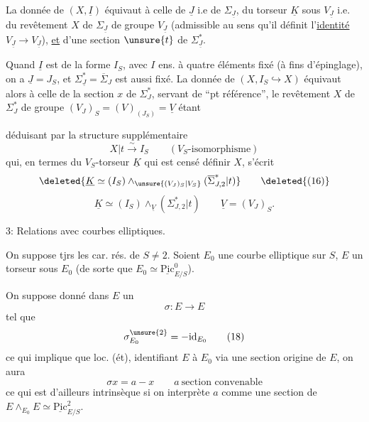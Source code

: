  La donnée de $(X,\underline I)$ équivaut à celle de \deleted{$\unsure{\Sigma}$} $\underline J$ i.e de $\Sigma_{\underline J}$, du torseur $\underline K$ sous $V_{\underline J}$ i.e. du revêtement  $X$ de $\Sigma_{\underline J}$  de groupe $V_{\underline J}$ (admissible au sens qu'il définit l'\uline{identité} $V_{\underline J}\longrightarrow V_{\underline J}$), \uline{et} d'une section $\unsure{t}$ de $\Sigma_{\underline J}^*$.

Quand $\underline I$ est  de la forme $I_S$,  avec $I$ ens. à quatre éléments fixé (à fins d'épinglage), on a $\underline J=J_S$, et $\Sigma_{\underline J}^*=\overline\Sigma_J$ est aussi fixé. La donnée de $(X,I_S\hookrightarrow X)$ équivaut alors à celle de la section $x$ de $\Sigma_J^*$, servant de ``pt référence'', le revêtement $X$ de $\Sigma_J^*$ de groupe $(V_J)_S=(V)_{(J_S)}=\underline V$ étant

déduisant par la  structure supplémentaire
\[
 X|t\xrightarrow{\sim}I_S\qquad(V_S\text{-isomorphisme}) \tag*{(15)}
\]
qui, en termes du $V_S$-torseur $\underline K$ qui est censé définir $X$, s'écrit
\[
 \deleted{\underline K\simeq(I_S)\mathbin{\wedge}_{\unsure{(V_J)_S|V_S}}(\overline\Sigma^*_{J,2}|t)} \tag*{\deleted{(16)}}
\]
\[
 \underline K\simeq(I_S)\mathbin{\wedge}_{\underline V}(\Sigma^*_{J,2}|t)\qquad \underline V=(V_J)_S. \tag*{(16)}
\]

3: \quad Relations avec courbes elliptiques.

On suppose tjrs les car. rés. de $S\ne 2$. Soient $E_0$ une courbe elliptique sur $S$, $E$ un torseur sous $E_0$ (de sorte que $E_0\simeq\underline{\mathrm{Pic}}^0_{E/S}$).

On suppose donné dans $E$ un 
\[
 \sigma:E\longrightarrow E \tag*{(17)}
\]
tel que
\[
 \sigma_{E_0}^{\unsure{2}}=-\mathrm{id}_{E_0} \tag*{(18)}
\]
ce qui implique que loc. (ét), identifiant $E$ à $E_0$ via une section origine de $E$, on aura
\[
 \sigma x=a-x\qquad a\ \text{section convenable}
\]
ce qui est d'ailleurs intrinsèque si on interprète $a$ comme une section de $E\mathbin{\wedge}_{E_0}E\simeq\underline{\mathrm{Pic}}^2_{E/S}$.

